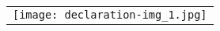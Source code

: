 \label{declaration}


\begin{center}
	\begin{tabular}{l}
		\texttt{[image: declaration-img\_1.jpg]}
	\end{tabular}
\end{center}

